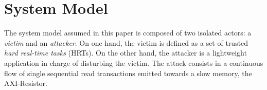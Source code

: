 \section{System Model}
    \label{sec:system_model}




    The system model assumed in this paper is composed of two isolated actors: a \emph{victim} and an \emph{attacker}.
    On one hand, the victim is defined as a set of trusted \emph{hard real-time tasks} (HRTs).
    On the other hand, the attacker is a lightweight application in charge of disturbing the victim.
    The attack consists in a continuous flow of single sequential read transactions emitted towards a slow memory, the AXI-Resistor.

